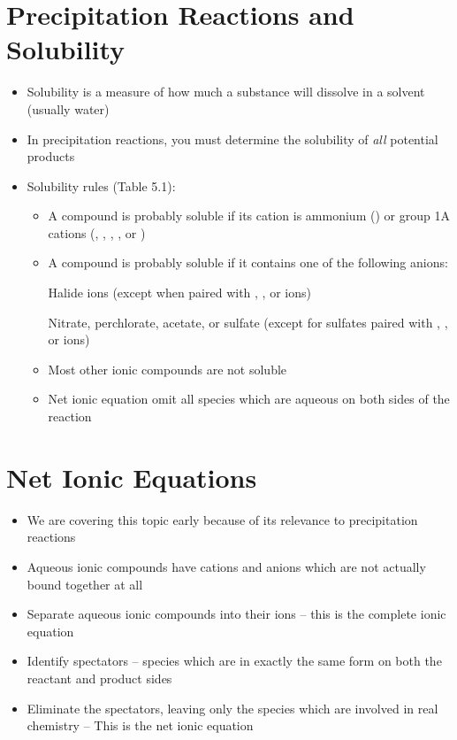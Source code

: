 \documentclass[12pt, openany, letterpaper]{memoir}
\begin{document}
\section{Precipitation Reactions and Solubility}
\begin{itemize}
	\item Solubility is a measure of how much a substance will dissolve in a solvent (usually water)
	\item In precipitation reactions, you must determine the solubility of \emph{all} potential products
	\item Solubility rules (Table 5.1):
	      \begin{itemize}
		      \item A compound is probably soluble if its cation is ammonium () or group 1A cations (, , , , or )
		      \item A compound is probably soluble if it contains one of the following anions:

		            Halide ions (except when paired with , , or  ions)

		            Nitrate, perchlorate, acetate, or sulfate (except for sulfates paired with , , or  ions)
		      \item Most other ionic compounds are not soluble
		      \item Net ionic equation omit all species which are aqueous on both sides of the reaction
	      \end{itemize}
\end{itemize}

\section*{Net Ionic Equations}
\begin{itemize}
  \item We are covering this topic early because of its relevance to precipitation reactions
  \item Aqueous ionic compounds have cations and anions which are not actually bound together at all
  \item Separate aqueous ionic compounds into their ions -- this is the complete ionic equation
  \item Identify spectators -- species which are in exactly the same form on both the reactant and product sides
  \item Eliminate the spectators, leaving only the species which are involved in real chemistry -- This is the net ionic equation
\end{itemize}
\end{document}
